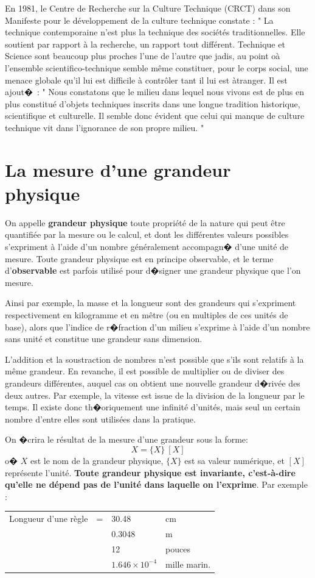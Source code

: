 En 1981, le Centre de Recherche sur la Culture Technique (CRCT) dans son Manifeste pour le développement de la culture technique constate : " La technique contemporaine n'est plus la technique des sociétés traditionnelles. Elle soutient par rapport à la recherche, un rapport tout différent. Technique et Science sont beaucoup plus proches l'une de l'autre que jadis, au point oà l'ensemble scientifico-technique semble même constituer, pour le corps social, une menace globale qu'il lui est difficile à contrôler tant il lui est àtranger. Il est ajout�~: " Nous constatons que le milieu dans lequel nous vivons est de plus en plus constitué d'objets techniques inscrits dans une longue tradition historique, scientifique et culturelle.  Il semble donc évident que celui qui manque de culture technique vit dans l'ignorance de son propre milieu. "

\rm

\section{La mesure d'une grandeur physique}

On appelle \textbf{grandeur physique} toute propriété de la nature qui peut être quantifiée par la mesure ou le calcul, et dont les différentes valeurs possibles s'expriment à l'aide d'un nombre généralement accompagn� d'une unité de mesure. Toute grandeur physique est en principe observable, et le terme d'\textbf{observable} est parfois utilisé pour d�signer une grandeur physique que l'on mesure.

Ainsi par exemple, la masse et la longueur sont des grandeurs qui s'expriment respectivement en kilogramme et en mêtre (ou en multiples de ces unités de base), alors que l'indice de r�fraction d'un milieu s'exprime à l'aide d'un nombre sans unité et constitue une grandeur sans dimension.

L'addition et la soustraction de nombres n'est possible que s'ils sont relatifs à la même grandeur. En revanche, il est possible de multiplier ou de diviser des grandeurs différentes, auquel cas on obtient une nouvelle grandeur d�rivée des deux autres. Par exemple, la vitesse est issue de la division de la longueur par le temps. Il existe donc th�oriquement une infinité d'unités, mais seul un certain nombre d'entre elles sont utilisées dans la pratique.

On �crira le résultat de la mesure d'une grandeur sous la forme:
$$
X = \{X\}\ [X]
$$
o� $X$ est le nom de la grandeur physique, $\{X\}$ est sa valeur numérique, et $[X]$ représente l'unité. \textbf{Toute grandeur physique est invariante, c'est-à-dire qu'elle ne dépend pas de l'unité dans laquelle on l'exprime}. Par exemple :
\begin{table}[htbp]
\begin{flushleft}
\begin{tabular}{lcll}
Longueur d'une règle & = & 30.48 & cm\\
& & 0.3048 & m\\
& & 12 & pouces\\
& & $1.646\times10^{-4}$ & mille marin.
\end{tabular}
\end{flushleft}
\end{table}

